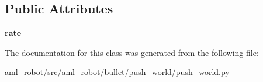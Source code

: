 \subsection*{Public Attributes}
\begin{DoxyCompactItemize}
\item 
\hypertarget{classaml__robot_1_1bullet_1_1push__world_1_1push__world_1_1_push_world_a5a2681569cf1de359b4437f822d5d9eb}{{\bfseries rate}}\label{classaml__robot_1_1bullet_1_1push__world_1_1push__world_1_1_push_world_a5a2681569cf1de359b4437f822d5d9eb}

\end{DoxyCompactItemize}


The documentation for this class was generated from the following file\-:\begin{DoxyCompactItemize}
\item 
aml\-\_\-robot/src/aml\-\_\-robot/bullet/push\-\_\-world/push\-\_\-world.\-py\end{DoxyCompactItemize}
